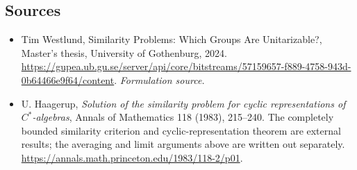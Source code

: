 \documentclass[11pt]{article}
\begin{document}
\subsection{Sources}
\begin{itemize}
\item[S1]Tim Westlund, Similarity Problems: Which Groups Are Unitarizable?, Master's thesis, University of Gothenburg, 2024.
\url{https://gupea.ub.gu.se/server/api/core/bitstreams/57159657-f889-4758-943d-0b64466e9f64/content}.
\textit{Formulation source.}
\item[E1]U. Haagerup, \textit{Solution of the similarity problem for cyclic representations of $C^*$-algebras}, Annals of Mathematics 118 (1983), 215--240. The completely bounded similarity criterion and cyclic-representation theorem are external results; the averaging and limit arguments above are written out separately.
\url{https://annals.math.princeton.edu/1983/118-2/p01}.

\end{itemize}
\end{document}
